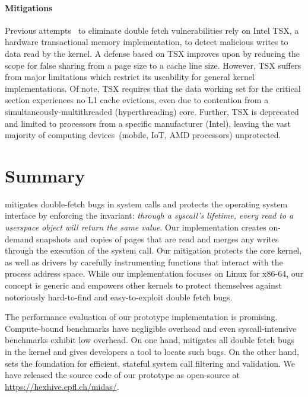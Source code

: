 \paragraph{Mitigations}
%
Previous attempts~\cite{schwartzDECAF,dftinker} to eliminate double fetch
vulnerabilities rely on Intel TSX, a hardware transactional
memory implementation, to detect malicious writes to data read by the
kernel.
A defense based on TSX improves upon \midas by reducing the scope for
false sharing from a page size to a cache line size.
However, TSX suffers from major limitations which restrict its useability
for general kernel implementations.
Of note, TSX requires that the data working set for the critical section
experiences no L1 cache evictions, even due to contention from a
simultaneously-multithreaded (hyperthreading) core.
Further, TSX is deprecated and limited to processors from a specific 
manufacturer (Intel), leaving the vast majority
of computing devices~(mobile, IoT, AMD processors) unprotected.

\section{\midas Summary}

\midas mitigates double-fetch bugs in system calls and protects the operating
system interface by enforcing the invariant:  \emph{through a syscall's
lifetime, every read to a userspace object will return the same value}.
Our \midas implementation creates on-demand snapshots and copies of pages that
are read and merges any writes through the execution of the system call.
%
Our mitigation protects the core kernel, as well as drivers by carefully
instrumenting functions that interact with the process address space. While our
implementation focuses on Linux for x86-64, our concept is generic and empowers
other kernels to protect themselves against notoriously hard-to-find and
easy-to-exploit double fetch bugs.

The performance evaluation of our prototype implementation is promising.
Compute-bound benchmarks have negligible overhead and even syscall-intensive
benchmarks exhibit low overhead. On one hand, \midas mitigates all double fetch
bugs in the kernel and gives developers a tool to locate such bugs. On the other
hand, \midas sets the foundation for efficient, stateful system call filtering
and validation.
%
We have released the source code of our prototype as open-source at
\url{https://hexhive.epfl.ch/midas/}.